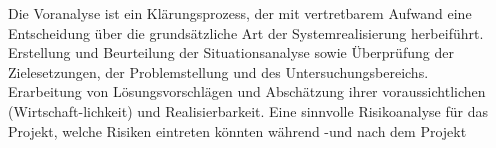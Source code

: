 Die Voranalyse ist ein Klärungsprozess, der mit vertretbarem Aufwand eine Entscheidung über die grundsätzliche Art der Systemrealisierung herbeiführt.\\
Erstellung und Beurteilung der Situationsanalyse sowie Überprüfung der Zielesetzungen, der Problemstellung und des Untersuchungsbereichs. \\
Erarbeitung von Lösungsvorschlägen und Abschätzung ihrer voraussichtlichen (Wirtschaft-lichkeit) und Realisierbarkeit. Eine sinnvolle Risikoanalyse für das Projekt, welche Risiken eintreten könnten während -und nach dem Projekt 